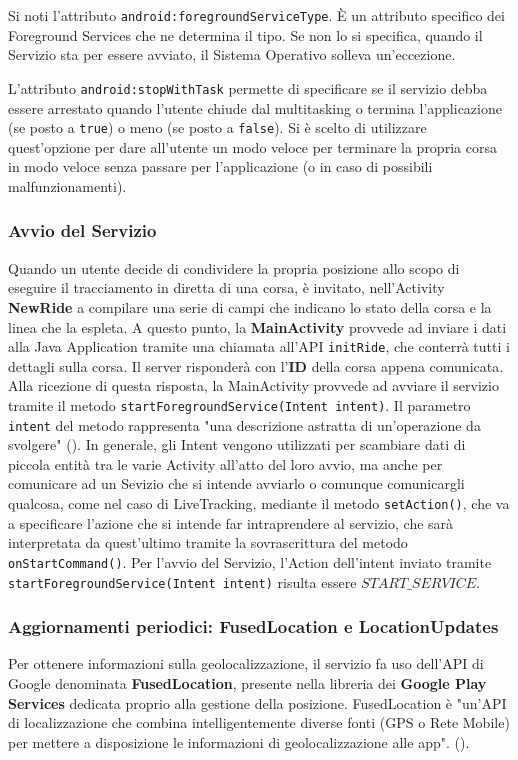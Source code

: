                     Si noti l'attributo \texttt{android:foregroundServiceType}. È un attributo specifico dei Foreground Services che ne determina il tipo. Se non lo si specifica, quando il Servizio sta per essere avviato, il Sistema Operativo solleva un'eccezione.

                    L'attributo \texttt{android:stopWithTask} permette di specificare se il servizio debba essere arrestato quando l'utente chiude dal multitasking o termina l'applicazione (se posto a \texttt{true}) o meno (se posto a \texttt{false}). Si è scelto di utilizzare quest'opzione per dare all'utente un modo veloce per terminare la propria corsa in modo veloce senza passare per l'applicazione (o in caso di possibili malfunzionamenti).


                    \subsubsection{Avvio del Servizio}
                        Quando un utente decide di condividere la propria posizione allo scopo di eseguire il tracciamento in diretta di una corsa, è invitato, nell'Activity \textbf{NewRide} a compilare una serie di campi che indicano lo stato della corsa e la linea che la espleta. A questo punto, la \textbf{MainActivity} provvede ad inviare i dati alla Java Application tramite una chiamata all'API \texttt{initRide}, che conterrà tutti i dettagli sulla corsa. Il server risponderà con l'\textbf{ID} della corsa appena comunicata. Alla ricezione di questa risposta, la MainActivity provvede ad avviare il servizio tramite il metodo \texttt{startForegroundService(Intent intent)}. Il parametro \texttt{intent} del metodo rappresenta "una descrizione astratta di un'operazione da svolgere" (\cite{AndroidIntent}). In generale, gli Intent vengono utilizzati per scambiare dati di piccola entità tra le varie Activity all'atto del loro avvio, ma anche per comunicare ad un Sevizio che si intende avviarlo o comunque comunicargli qualcosa, come nel caso di LiveTracking, mediante il metodo \texttt{setAction()}, che va a specificare l'azione che si intende far intraprendere al servizio, che sarà interpretata da quest'ultimo tramite la sovrascrittura del metodo \texttt{onStartCommand()}. Per l'avvio del Servizio, l'Action dell'intent inviato tramite \texttt{startForegroundService(Intent intent)} risulta essere  
                        \texttt{$START\_SERVICE$}.
                    \subsubsection{Aggiornamenti periodici: FusedLocation e LocationUpdates}
                        Per ottenere informazioni sulla geolocalizzazione, il servizio fa uso dell'API di Google denominata \textbf{FusedLocation}, presente nella libreria dei \textbf{Google Play Services} dedicata proprio alla gestione della posizione.
                        FusedLocation è "un'API di localizzazione che combina intelligentemente diverse fonti (GPS o Rete Mobile) per mettere a disposizione le informazioni di geolocalizzazione alle app". (\cite{PlayServicesFusedLocation}).

